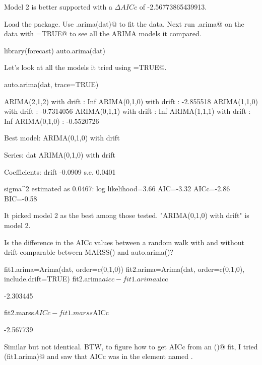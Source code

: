 \begin{wideenumerate}
\begin{Schunk}
\begin{Soutput}
\end{Soutput}
\end{Schunk}
Model 2 is better supported with a $\Delta AICc$ of -2.56773865439913.
\item Load the \verb@forecast@ package. Use \verb@auto.arima(dat)@  to fit the data.  Next run \verb@auto.arima@ on the data with \verb@trace=TRUE@ to see all the ARIMA models it compared. 
\begin{Schunk}
\begin{Sinput}
 library(forecast)
 auto.arima(dat)
\end{Sinput}
\end{Schunk}
Let's look at all the models it tried using \verb@trace=TRUE@.
\begin{Schunk}
\begin{Sinput}
 auto.arima(dat, trace=TRUE)
\end{Sinput}
\begin{Soutput}
 ARIMA(2,1,2) with drift         : Inf
 ARIMA(0,1,0) with drift         : -2.855518
 ARIMA(1,1,0) with drift         : -0.7314056
 ARIMA(0,1,1) with drift         : Inf
 ARIMA(1,1,1) with drift         : Inf
 ARIMA(0,1,0)                    : -0.5520726

 Best model: ARIMA(0,1,0) with drift         

Series: dat 
ARIMA(0,1,0) with drift         

Coefficients:
        drift
      -0.0909
s.e.   0.0401

sigma^2 estimated as 0.0467:  log likelihood=3.66
AIC=-3.32   AICc=-2.86   BIC=-0.58
\end{Soutput}
\end{Schunk}
It picked model 2 as the best among those tested.  "ARIMA(0,1,0) with drift" is model 2.  

\item Is the difference in the AICc values between a random walk with and without drift comparable between MARSS() and auto.arima()?
\begin{Schunk}
\begin{Sinput}
 fit1.arima=Arima(dat, order=c(0,1,0))
 fit2.arima=Arima(dat, order=c(0,1,0), include.drift=TRUE)
 fit2.arima$aicc-fit1.arima$aicc
\end{Sinput}
\begin{Soutput}
[1] -2.303445
\end{Soutput}
\begin{Sinput}
 fit2.marss$AICc-fit1.marss$AICc
\end{Sinput}
\begin{Soutput}
[1] -2.567739
\end{Soutput}
\end{Schunk}
Similar but not identical.  BTW, to figure how to get AICc from an \verb@Arima()@ fit, I tried \verb@names(fit1.arima)@ and saw that AICc was in the element named \verb@aicc@.
\end{wideenumerate}

